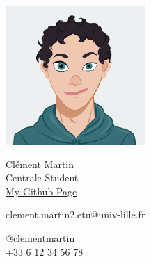 \documentclass{article}
\begin{document}
\centering \includegraphics[width=.20\linewidth]{Avatar}\\[5pt]
\parbox{2in}{\Large \centering Clément Martin\\[1pt]
\normalsize Centrale Student \\
\tiny \href{https://clementmartinetu.github.io}{My Github Page}}

\vfill
\raggedright
\begin{multicols}{2}
clement.martin2.etu@univ-lille.fr

\columnbreak
\raggedleft
@clementmartin\\
+33 6 12 34 56 78%
\end{multicols}%
\end{document}
